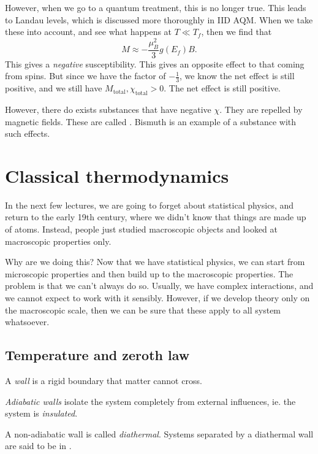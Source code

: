 \documentclass[a4paper]{article}
\begin{document}
However, when we go to a quantum treatment, this is no longer true. This leads to Landau levels, which is discussed more thoroughly in IID AQM. When we take these into account, and see what happens at $T \ll T_f$, then we find that
\[
  M \approx - \frac{\mu_B^2}{3} g(E_f) B.
\]
This gives a \emph{negative} susceptibility. This gives an opposite effect to that coming from spins. But since we have the factor of $-\frac{1}{3}$, we know the net effect is still positive, and we still have $M_{\mathrm{total}}, \chi_{\mathrm{total}} > 0$. The net effect is still positive.

However, there do exists substances that have negative $\chi$. They are repelled by magnetic fields. These are called . Bismuth is an example of a substance with such effects.

\section{Classical thermodynamics}
In the next few lectures, we are going to forget about statistical physics, and return to the early 19th century, where we didn't know that things are made up of atoms. Instead, people just studied macroscopic objects and looked at macroscopic properties only.

Why are we doing this? Now that we have statistical physics, we can start from microscopic properties and then build up to the macroscopic properties. The problem is that we can't always do so. Usually, we have complex interactions, and we cannot expect to work with it sensibly. However, if we develop theory only on the macroscopic scale, then we can be sure that these apply to all system whatsoever.

\subsection{Temperature and zeroth law}
\begin{defi}[Wall]
  A \emph{wall} is a rigid boundary that matter cannot cross.
\end{defi}

\begin{defi}
  \emph{Adiabatic walls} isolate the system completely from external influences, ie. the system is \emph{insulated}.
\end{defi}
\begin{defi}
  A non-adiabatic wall is called \emph{diathermal}. Systems separated by a diathermal wall are said to be in .
\end{defi}
\end{document}
